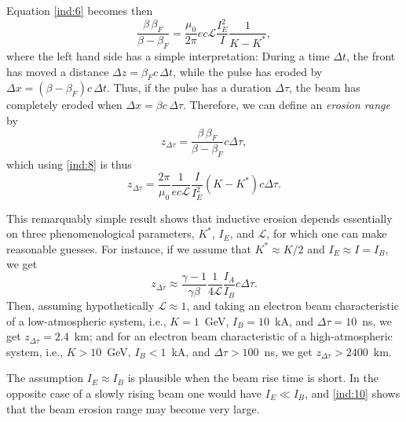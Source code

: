 \documentclass [12pt,a4paper,     ]{report} %
\begin{document}
   Equation \eqref{ind:6} becomes then
%
\begin{equation}\label{ind:8} %
       \frac{\beta \, \beta_F}{\beta - \beta_F}
      = \frac{\mu_0}{2\pi} ec \mathcal{L} \frac{I_E^2}{I} \frac{1}{K-K^*},
\end{equation}
%
where the left hand side has a simple interpretation: During a time $\Delta t$, the front has moved a distance $\Delta z = \beta_F c \, \Delta t$, while the pulse has eroded by $\Delta x = (\beta -\beta_F) c \, \Delta t$.  Thus, if the pulse has a duration $\Delta \tau$, the beam has completely eroded when $\Delta x = \beta  c \, \Delta \tau$.  Therefore, we can define an \emph{erosion range} by 
%
\begin{equation}\label{ind:9} %
       z_{\Delta \tau} = \frac{\beta \, \beta_F}{\beta - \beta_F} c \Delta \tau,
\end{equation}
%
which using \eqref{ind:8} is thus
%
\begin{equation}\label{ind:10} %
       z_{\Delta \tau} = \frac{2\pi}{\mu_0}
                         \frac{1}{ec\mathcal{L}}
                         \frac{I}{I_E^2}(K-K^*) c\Delta \tau.
\end{equation}
%

   This remarquably simple result shows that inductive erosion depends essentially on three phenomenological parameters, $K^*$, $I_E$, and $\mathcal{L}$, for which one can make reasonable guesses.  For instance, if we assume that $K^* \approx K/2$ and $I_E \approx I = I_B$, we get
%
\begin{equation}\label{ind:11} %
       z_{\Delta \tau} \approx  \frac{\gamma-1}{\gamma\beta}
                                \frac{1}{4\mathcal{L}}
                                \frac{I_A}{I_B} c\Delta \tau.
\end{equation}
%
Then, assuming hypothetically $\mathcal{L}\approx 1$, and taking an electron beam characteristic of a low-atmospheric system, i.e., $K=1$~GeV, $I_B=10$~kA, and $\Delta \tau=10$~ns, we get $z_{\Delta \tau}=2.4$~km; and for an electron beam characteristic of a high-atmospheric system, i.e., $K>10$~GeV, $I_B<1$~kA, and $\Delta \tau>100$~ns, we get $z_{\Delta \tau}>2400$~km.

   The assumption $I_E \approx I_B$ is plausible when the beam rise time is short.  In the opposite case of a slowly rising beam one would have $I_E \ll I_B$, and \eqref{ind:10} shows that the beam erosion range may become very large.
\end{document}
